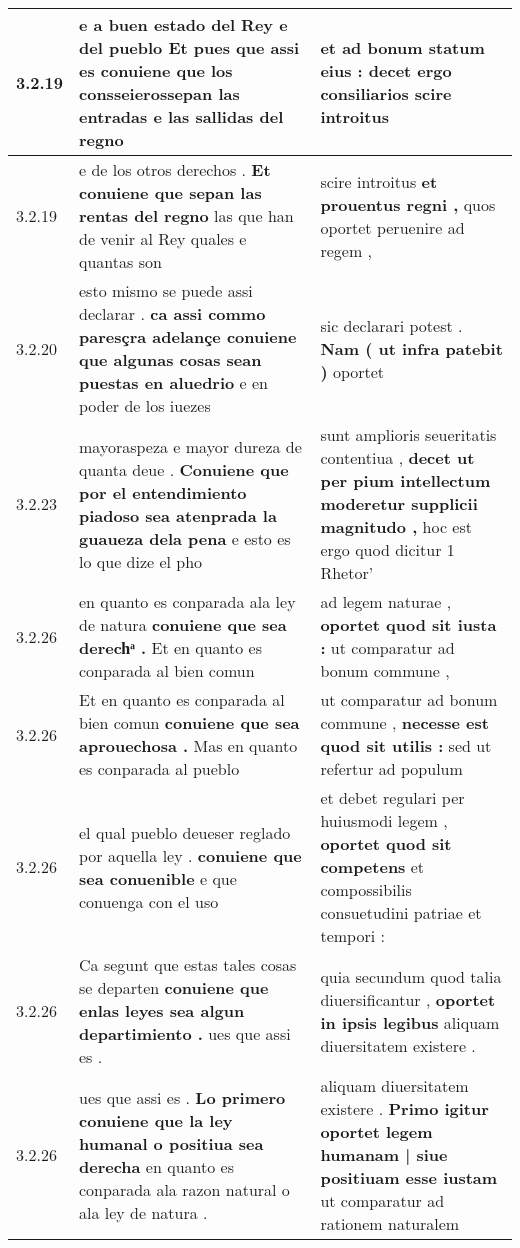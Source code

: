 \begin{tabular}{|p{1cm}|p{6.5cm}|p{6.5cm}|}
3.2.19 & e a buen estado del Rey e del pueblo \textbf{ Et pues que assi es conuiene que los } consseierossepan las entradas e las sallidas del regno & et ad bonum statum eius : \textbf{ decet ergo consiliarios } scire introitus \\\hline
3.2.19 & e de los otros derechos . \textbf{ Et conuiene que sepan las rentas del regno } las que han de venir al Rey quales e quantas son & scire introitus \textbf{ et prouentus regni , } quos oportet peruenire ad regem , \\\hline
3.2.20 & esto mismo se puede assi declarar . \textbf{ ca assi commo paresçra adelançe conuiene que algunas cosas sean puestas en aluedrio } e en poder de los iuezes & sic declarari potest . \textbf{ Nam ( ut infra patebit ) } oportet \\\hline
3.2.23 & mayoraspeza e mayor dureza de quanta deue . \textbf{ Conuiene que por el entendimiento piadoso sea atenprada la guaueza dela pena } e esto es lo que dize el pho & sunt amplioris seueritatis contentiua , \textbf{ decet ut per pium intellectum moderetur supplicii magnitudo , } hoc est ergo quod dicitur 1 Rhetor’ \\\hline
3.2.26 & en quanto es conparada ala ley de natura \textbf{ conuiene que sea derechͣ . } Et en quanto es conparada al bien comun & ad legem naturae , \textbf{ oportet quod sit iusta : } ut comparatur ad bonum commune , \\\hline
3.2.26 & Et en quanto es conparada al bien comun \textbf{ conuiene que sea aprouechosa . } Mas en quanto es conparada al pueblo & ut comparatur ad bonum commune , \textbf{ necesse est quod sit utilis : } sed ut refertur ad populum \\\hline
3.2.26 & el qual pueblo deueser reglado por aquella ley . \textbf{ conuiene que sea conuenible } e que conuenga con el uso & et debet regulari per huiusmodi legem , \textbf{ oportet quod sit competens } et compossibilis consuetudini patriae et tempori : \\\hline
3.2.26 & Ca segunt que estas tales cosas se departen \textbf{ conuiene que enlas leyes sea algun departimiento . } ues que assi es . & quia secundum quod talia diuersificantur , \textbf{ oportet in ipsis legibus } aliquam diuersitatem existere . \\\hline
3.2.26 & ues que assi es . \textbf{ Lo primero conuiene que la ley humanal o positiua sea derecha } en quanto es conparada ala razon natural o ala ley de natura . & aliquam diuersitatem existere . \textbf{ Primo igitur oportet legem humanam | siue positiuam esse iustam } ut comparatur ad rationem naturalem \\\hline

\end{tabular}
